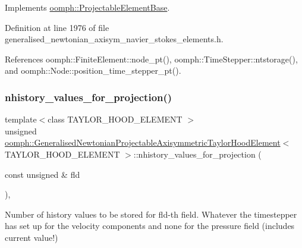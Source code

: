 Implements \hyperlink{classoomph_1_1ProjectableElementBase_ab4ecd0cd24000a3ed675dc7198203c1f}{oomph\+::\+Projectable\+Element\+Base}.



Definition at line 1976 of file generalised\+\_\+newtonian\+\_\+axisym\+\_\+navier\+\_\+stokes\+\_\+elements.\+h.



References oomph\+::\+Finite\+Element\+::node\+\_\+pt(), oomph\+::\+Time\+Stepper\+::ntstorage(), and oomph\+::\+Node\+::position\+\_\+time\+\_\+stepper\+\_\+pt().

\mbox{\label{classoomph_1_1GeneralisedNewtonianProjectableAxisymmetricTaylorHoodElement_a128887a8ec6ac7e2054d5343e85afde1}} 
\subsubsection{\texorpdfstring{nhistory\+\_\+values\+\_\+for\+\_\+projection()}{nhistory\_values\_for\_projection()}}
{\footnotesize\ttfamily template$<$class T\+A\+Y\+L\+O\+R\+\_\+\+H\+O\+O\+D\+\_\+\+E\+L\+E\+M\+E\+NT $>$ \\
unsigned \hyperlink{classoomph_1_1GeneralisedNewtonianProjectableAxisymmetricTaylorHoodElement}{oomph\+::\+Generalised\+Newtonian\+Projectable\+Axisymmetric\+Taylor\+Hood\+Element}$<$ T\+A\+Y\+L\+O\+R\+\_\+\+H\+O\+O\+D\+\_\+\+E\+L\+E\+M\+E\+NT $>$\+::nhistory\+\_\+values\+\_\+for\+\_\+projection (\begin{DoxyParamCaption}\item[{const unsigned \&}]{fld }\end{DoxyParamCaption})\hspace{0.3cm}{\ttfamily [inline]}, {\ttfamily [virtual]}}



Number of history values to be stored for fld-\/th field. Whatever the timestepper has set up for the velocity components and none for the pressure field (includes current value!) 



